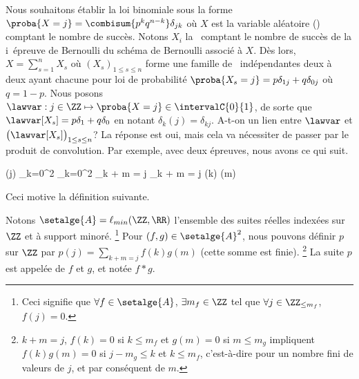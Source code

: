 Nous souhaitons établir la loi binomiale sous la forme
$\proba{X = j} = \combisum{p^k q^{n-k}} \delta_{jk}$
où $X$ est la variable aléatoire (\va) comptant le nombre de succès.
%
Notons $X_i$ la \va\ comptant le nombre de succès de la i\ieme\ épreuve de Bernoulli du schéma de Bernoulli associé à $X$.
Dès lors,
$X = \sum_{s=1}^{n} X_s$ 
où
$(X_s)_{1 \leq s \leq n}$ forme une famille de \va\ indépendantes deux à deux  ayant chacune pour loi de probabilité $\proba{X_s = j} = p \delta_{1j} + q \delta_{0j}$ où $q = 1 - p$.
Nous posons
$\lawvar: j \in \ZZ \mapsto \proba{X = j} \in \intervalC{0}{1}$,
de sorte que
$\lawvar[X_s] = p \delta_{1} + q \delta_{0}$
en notant
$\delta_{k}(j) = \delta_{kj}$.
A-t-on un lien entre $\lawvar$ et $\big( \lawvar[X_s] \big)_{1 \leq s \leq n}$? La réponse est oui, mais cela va nécessiter de passer par le produit de convolution.
%
Par exemple, avec deux épreuves, nous avons ce qui suit.

\begin{stepcalc}[style=sar]
	\lawvar(j)
\explnext{}
\explnext{}
	\dsum_{k=0}^{2} 
	\dsum_{k=0}^{2}  
	\dsum_{k + m = j}  
\explnext{}
	\dsum_{k + m = j} \lawvar[X_1](k) \lawvar[X_2](m)
\end{stepcalc}

Ceci motive la définition suivante.




\begin{defi}
	Notons $\setalge{A} = \ell_{min}(\ZZ , \RR)$ l'ensemble des suites réelles indexées sur $\ZZ$ et à support minoré.%
	\footnote{
		Ceci signifie que 
		$\forall f \in \setalge{A}$, 
		$\exists m_f \in \ZZ$ 
		tel que
		$\forall j \in \ZZ_{\leq m_f}$, $f(j) = 0$.
	}
	Pour $(f,g) \in \setalge{A}^2$,
	nous pouvons définir $p$ sur $\ZZ$ par
	$p(j) = \sum_{k + m = j} f(k) g(m)$
	(cette somme est finie).%
	\footnote{
		$k + m = j$,
		$f(k) = 0$ si $k \leq m_f$
		et
		$g(m) = 0$ si $m \leq m_g$
		impliquent
		$f(k) g(m) = 0$
		si
		$j - m_g \leq k$ et $k \leq m_f$,
		c'est-à-dire pour un nombre fini de valeurs de $j$, et par conséquent de $m$.
		
	}
	La suite $p$ est appelée  de $f$ et $g$,
	et notée $f \ast g$.
\end{defi}


